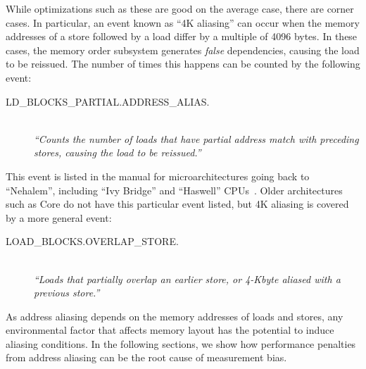 \documentclass[10pt, conference, compsocconf]{IEEEtran}
\begin{document}
While optimizations such as these are good on the average case, there are corner cases. 
In particular, an event known as ``4K aliasing'' can occur when the memory addresses of a store followed by a load differ by a multiple of 4096 bytes.
In these cases, the memory order subsystem generates \emph{false} dependencies, causing the load to be reissued.
The number of times this happens can be counted by the following event:
\begin{description}
  \item[{\small LD\_BLOCKS\_PARTIAL.ADDRESS\_ALIAS.}] 
  \hfill \\ \emph{``Counts the number of loads that have partial address match with preceding stores, causing the load to be reissued.''} 
  \cite[B.3.4.4]{OptimizationManual}
\end{description}
This event is listed in the manual for microarchitectures going back to ``Nehalem'', including ``Ivy Bridge'' and ``Haswell'' CPUs~\cite{Volume3B}.
Older architectures such as Core do not have this particular event listed, but 4K aliasing is covered by a more general event:
\begin{description}
  \item[{\small LOAD\_BLOCKS.OVERLAP\_STORE.}] 
  \hfill \\ \emph{``Loads that partially overlap an earlier store, or 4-Kbyte aliased with a previous store.''} 
  \cite[Table 19-17]{Volume3B}
\end{description}
As address aliasing depends on the memory addresses of loads and stores, any environmental factor that affects memory layout has the potential to induce aliasing conditions.
In the following sections, we show how performance penalties from address aliasing can be the root cause of measurement bias.
\end{document}
